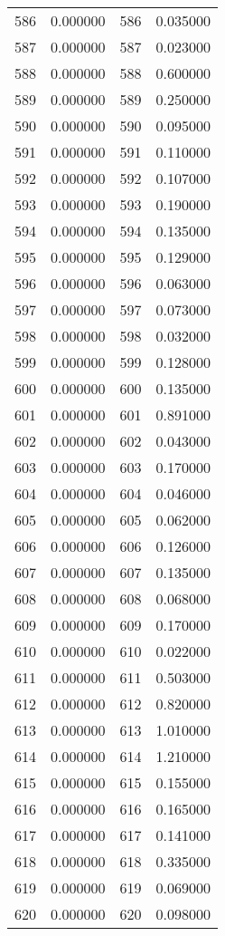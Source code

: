 \documentclass[12pt]{article}
\begin{document}
\begin{longtable}{@{}cccc@{}}
586 & 0.000000 & 586 & 0.035000 \\
587 & 0.000000 & 587 & 0.023000 \\
588 & 0.000000 & 588 & 0.600000 \\
589 & 0.000000 & 589 & 0.250000 \\
590 & 0.000000 & 590 & 0.095000 \\
591 & 0.000000 & 591 & 0.110000 \\
592 & 0.000000 & 592 & 0.107000 \\
593 & 0.000000 & 593 & 0.190000 \\
594 & 0.000000 & 594 & 0.135000 \\
595 & 0.000000 & 595 & 0.129000 \\
596 & 0.000000 & 596 & 0.063000 \\
597 & 0.000000 & 597 & 0.073000 \\
598 & 0.000000 & 598 & 0.032000 \\
599 & 0.000000 & 599 & 0.128000 \\
600 & 0.000000 & 600 & 0.135000 \\
601 & 0.000000 & 601 & 0.891000 \\
602 & 0.000000 & 602 & 0.043000 \\
603 & 0.000000 & 603 & 0.170000 \\
604 & 0.000000 & 604 & 0.046000 \\
605 & 0.000000 & 605 & 0.062000 \\
606 & 0.000000 & 606 & 0.126000 \\
607 & 0.000000 & 607 & 0.135000 \\
608 & 0.000000 & 608 & 0.068000 \\
609 & 0.000000 & 609 & 0.170000 \\
610 & 0.000000 & 610 & 0.022000 \\
611 & 0.000000 & 611 & 0.503000 \\
612 & 0.000000 & 612 & 0.820000 \\
613 & 0.000000 & 613 & 1.010000 \\
614 & 0.000000 & 614 & 1.210000 \\
615 & 0.000000 & 615 & 0.155000 \\
616 & 0.000000 & 616 & 0.165000 \\
617 & 0.000000 & 617 & 0.141000 \\
618 & 0.000000 & 618 & 0.335000 \\
619 & 0.000000 & 619 & 0.069000 \\
620 & 0.000000 & 620 & 0.098000 \\

\end{longtable}
\end{document}
